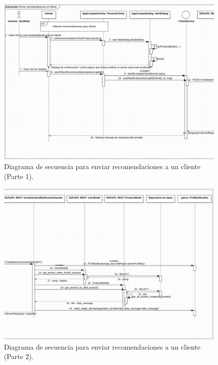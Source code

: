 \FloatBarrier
\begin{figure}[htbp!]
		\centering
			\includegraphics[width=1 \textwidth]{imagenes/adrian/vendedor/prototipo3/enviarRecomendaciones1}
		\caption{Diagrama de secuencia para enviar recomendaciones a un cliente (Parte 1).}
		\label{secuencia-AIPV3-recomUno}
\end{figure}
\FloatBarrier

\FloatBarrier
\begin{figure}[htbp!]
		\centering
			\includegraphics[width=1 \textwidth]{imagenes/adrian/vendedor/prototipo3/enviarRecomendaciones2}
		\caption{Diagrama de secuencia para enviar recomendaciones a un cliente (Parte 2).}
		\label{secuencia-AIPV3-recomDos}
\end{figure}
\FloatBarrier

